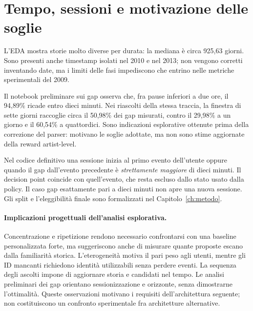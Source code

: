 \section{Tempo, sessioni e motivazione delle soglie}
L'EDA mostra storie molto diverse per durata: la mediana è circa 925,63 giorni. Sono presenti anche timestamp isolati nel 2010 e nel 2013; non vengono corretti inventando date, ma i limiti delle fasi impediscono che entrino nelle metriche sperimentali del 2009.

Il notebook preliminare sui gap osserva che, fra pause inferiori a due ore, il 94,89\% ricade entro dieci minuti. Nei riascolti della stessa traccia, la finestra di sette giorni raccoglie circa il 50,98\% dei gap misurati, contro il 29,98\% a un giorno e il 60,54\% a quattordici. Sono indicazioni esplorative ottenute prima della correzione del parser: motivano le soglie adottate, ma non sono stime aggiornate della reward artist-level.

Nel codice definitivo una sessione inizia al primo evento dell'utente oppure quando il gap dall'evento precedente è \emph{strettamente maggiore} di dieci minuti. Il decision point coincide con quell'evento, che resta escluso dallo stato usato dalla policy. Il caso gap esattamente pari a dieci minuti non apre una nuova sessione. Gli split e l'eleggibilità finale sono formalizzati nel Capitolo~\ref{ch:metodo}.

\paragraph{Implicazioni progettuali dell'analisi esplorativa.}
Concentrazione e ripetizione rendono necessario confrontarsi con una baseline personalizzata forte, ma suggeriscono anche di misurare quante proposte escano dalla familiarità storica. L'eterogeneità motiva il pari peso agli utenti, mentre gli ID mancanti richiedono identità utilizzabili senza perdere eventi. La sequenza degli ascolti impone di aggiornare storia e candidati nel tempo. Le analisi preliminari dei gap orientano sessionizzazione e orizzonte, senza dimostrarne l'ottimalità. Queste osservazioni motivano i requisiti dell'architettura seguente; non costituiscono un confronto sperimentale fra architetture alternative.
